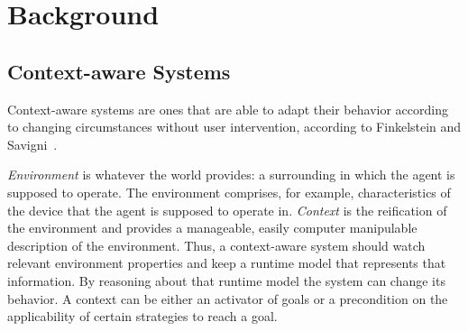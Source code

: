 \section{Background}
\label{sec:background}



\subsection{Context-aware Systems}
Context-aware systems are ones that are able to adapt their behavior according to changing circumstances without user intervention, according to Finkelstein and Savigni~\cite{finkelstein_framework_2001}.

\emph{Environment} is whatever the world provides: a surrounding in which the agent is supposed to operate. The environment comprises, for example, characteristics of the device that the agent is supposed to operate in. \emph{Context} is the reification of the environment and provides a manageable, easily computer manipulable description of the environment. Thus, a context-aware system should watch relevant environment properties and keep a runtime model that represents that information. By reasoning about that runtime model the system can change its behavior. A context can be either an activator of goals or a precondition on the applicability of certain strategies to reach a goal.




